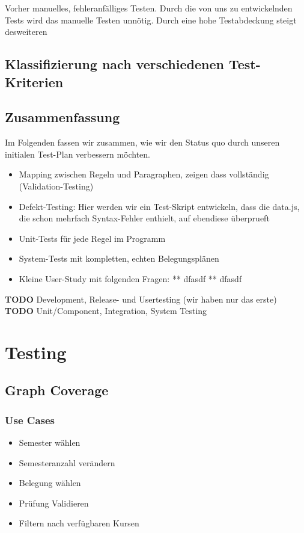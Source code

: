 \documentclass[ngerman]{article}
\begin{document}
Vorher manuelles, fehleranfälliges Testen. Durch die von uns zu
entwickelnden Tests wird das manuelle Testen unnötig. Durch eine hohe
Testabdeckung steigt desweiteren

\subsection{Klassifizierung nach verschiedenen Test-Kriterien}


\subsection{Zusammenfassung}
\label{sec:zusammenfassung}

Im Folgenden fassen wir zusammen, wie wir den Status quo durch unseren
initialen Test-Plan verbessern möchten.

\begin{itemize}
    \item Mapping zwischen Regeln und Paragraphen, zeigen dass vollständig (Validation-Testing)
    \item
        Defekt-Testing: Hier werden wir ein Test-Skript entwickeln, dass die data.js, die schon mehrfach Syntax-Fehler enthielt, auf ebendiese überprueft
    \item
        Unit-Tests für jede Regel im Programm
    \item
        System-Tests mit kompletten, echten Belegungsplänen
    \item
        Kleine User-Study mit folgenden Fragen: ** dfasdf ** dfasdf
\end{itemize}

\textbf{TODO} Development, Release- und Usertesting (wir haben nur das erste) \textbf{TODO} Unit/Component, Integration, System Testing

\section{Testing}

\subsection{Graph Coverage}
\subsubsection{Use Cases}

\begin{itemize}
\item Semester wählen
\item Semesteranzahl verändern
\item Belegung wählen
\item Prüfung Validieren
\item Filtern nach verfügbaren Kursen
\end{itemize}
\end{document}
